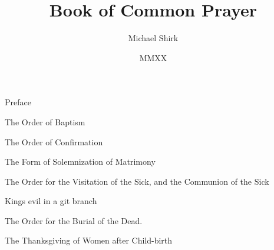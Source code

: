 \documentclass[foolscapvopaper,11pt,twoside,openany,extrafontsizes,final]{memoir}
\begin{document}
\frontmatter
\title{Book of Common Prayer}
\author{Michael Shirk}
\date{MMXX}

\tableofcontents*


Preface

\mainmatter









% 

The Order of Baptism



The Order of Confirmation



The Form of Solemnization of Matrimony

The Order for the Visitation of the Sick, and the Communion of the Sick

Kings evil in a git branch

The Order for the Burial of the Dead.

The Thanksgiving of Women after Child-birth


\end{document}
